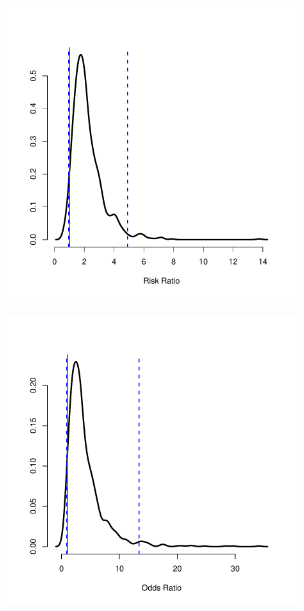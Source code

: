 \documentclass[aspectratio=169]{beamer}
\begin{document}
\begin{frame}
  \includegraphics[height=3in]{MCposterior2sampleBinomRR.pdf}
\end{frame}

\begin{frame}
  \includegraphics[height=3in]{MCposterior2sampleBinomOR.pdf}
\end{frame}
\end{document}
